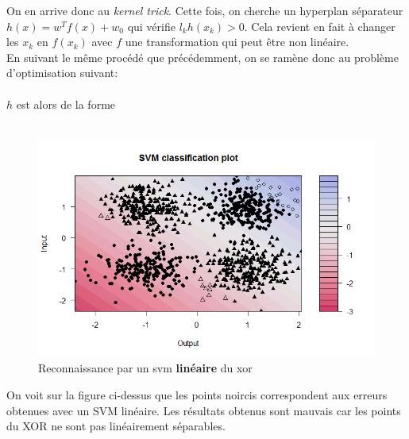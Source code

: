 \documentclass{article}
\theoremstyle{definition}
\begin{document}
\noindent On en arrive donc au \textit{kernel trick}. Cette fois, on cherche un hyperplan séparateur $h(x)=w^T f(x)+w_0$ qui vérifie $l_k h(x_k)>0$. Cela revient en fait à changer les $x_k$ en $f(x_k)$ avec $f$ une transformation qui peut être non linéaire.\\

\noindent En suivant le même procédé que précédemment, on se ramène donc au problème d'optimisation suivant:\\


\\


\noindent $h$ est alors de la forme\\

\\
\newpage
\begin{figure}[!h]\centering
\includegraphics[scale=0.6]{svmlinxor.png}
\caption{Reconnaissance par un svm \textbf{linéaire} du xor}
\label{fig:svmlinxor}
\end{figure}

\noindent On voit sur la figure ci-dessus que les points noircis correspondent aux erreurs obtenues avec un SVM linéaire. Les résultats obtenus sont mauvais car les points du XOR ne sont pas linéairement séparables.
\end{document}
